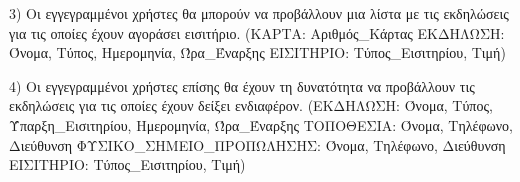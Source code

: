 3) Οι εγγεγραμμένοι χρήστες θα μπορούν να προβάλλουν μια λίστα με τις
εκδηλώσεις για τις οποίες έχουν αγοράσει εισιτήριο.
(ΚΑΡΤΑ: Αριθμός\_Κάρτας \+ ΕΚΔΗΛΩΣΗ: Όνομα, Τύπος, Ημερομηνία, Ώρα\_Έναρξης
\+ ΕΙΣΙΤΗΡΙΟ: Τύπος\_Εισιτηρίου, Τιμή)

4) Οι εγγεγραμμένοι χρήστες επίσης θα έχουν τη δυνατότητα να προβάλλουν
τις εκδηλώσεις για τις οποίες έχουν δείξει ενδιαφέρον.
(ΕΚΔΗΛΩΣΗ: Όνομα, Τύπος, Ύπαρξη\_Εισιτηρίου, Ημερομηνία, Ώρα\_Έναρξης
\+ ΤΟΠΟΘΕΣΙΑ: Όνομα, Τηλέφωνο, Διεύθυνση \+ ΦΥΣΙΚΟ\_ΣΗΜΕΙΟ\_ΠΡΟΠΩΛΗΣΗΣ:
Όνομα, Τηλέφωνο, Διεύθυνση \+ ΕΙΣΙΤΗΡΙΟ: Τύπος\_Εισιτηρίου, Τιμή)

